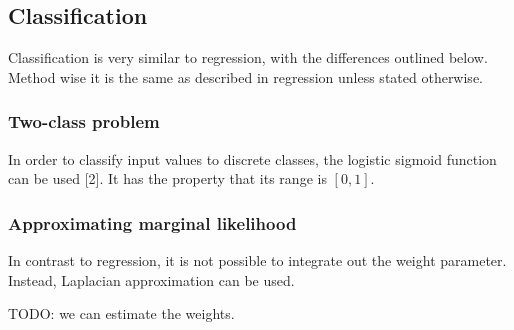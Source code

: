 \subsection{Classification}
Classification is very similar to regression, with the differences outlined below. Method wise it is the same as described in regression unless stated otherwise.

\subsubsection{Two-class problem}
In order to classify input values to discrete classes, the logistic sigmoid function can be used [2]. It has the property that its range is $[0,1]$.

\subsubsection{Approximating marginal likelihood}
In contrast to regression, it is not possible to integrate out the weight parameter. Instead, Laplacian approximation can be used.


TODO: we can estimate the weights.
